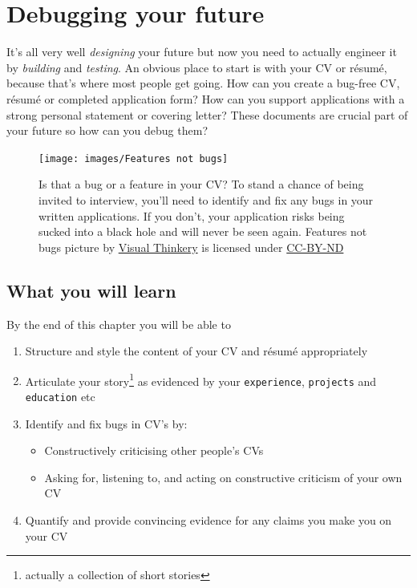 \documentclass[
]{book}
\providecommand{\tightlist}{%
  \setlength{\itemsep}{0pt}\setlength{\parskip}{0pt}}
\begin{document}
\hypertarget{debugging}{%
\chapter{Debugging your future}\label{debugging}}

It's all very well \emph{designing} your future but now you need to actually engineer it by \emph{building} and \emph{testing}. An obvious place to start is with your CV or résumé, because that's where most people get going. How can you create a bug-free CV, résumé or completed application form? How can you support applications with a strong personal statement or covering letter? These documents are crucial part of your future so how can you debug them? 🐛

\begin{figure}

{\centering \texttt{[image: images/Features not bugs]} 

}

\caption{Is that a bug or a feature in your CV? To stand a chance of being invited to interview, you'll need to identify and fix any bugs in your written applications. If you don't, your application risks being sucked into a black hole and will never be seen again. Features not bugs picture by \href{https://visualthinkery.com}{Visual Thinkery} is licensed under \href{https://creativecommons.org/licenses/by-nd/4.0/}{CC-BY-ND}}\label{fig:bugfeature-fig}
\end{figure}



\hypertarget{ilo7}{%
\section{What you will learn}\label{ilo7}}

By the end of this chapter you will be able to

\begin{enumerate}
\def\labelenumi{\arabic{enumi}.}
\tightlist
\item
  Structure and style the content of your CV and résumé appropriately
\item
  Articulate your story\footnote{actually a collection of short stories} as evidenced by your \texttt{experience}, \texttt{projects} and \texttt{education} etc
\item
  Identify and fix bugs in CV's by:

  \begin{itemize}
  \tightlist
  \item
    Constructively criticising other people's CVs
  \item
    Asking for, listening to, and acting on constructive criticism of your own CV
  \end{itemize}
\item
  Quantify and provide convincing evidence for any claims you make you on your CV
\end{enumerate}
\end{document}
